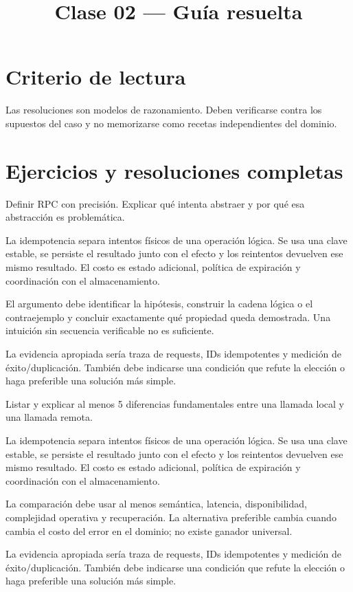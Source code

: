 \documentclass[variant=guia,cover=institutional,mode=screen]{ua-engineering-v6-article}
\title{Clase 02 --- Guía resuelta}
\author{\UAProfessor}
\date{\UADate}
\begin{document}
\section{Criterio de lectura}
Las resoluciones son modelos de razonamiento. Deben verificarse contra los supuestos del caso y no memorizarse como recetas independientes del dominio.

\section{Ejercicios y resoluciones completas}
\begin{uaexercise}
Definir RPC con precisión. Explicar qué intenta abstraer y por qué esa abstracción es problemática.
\end{uaexercise}
\begin{uaanswer}
La idempotencia separa intentos físicos de una operación lógica. Se usa una clave estable, se persiste el resultado junto con el efecto y los reintentos devuelven ese mismo resultado. El costo es estado adicional, política de expiración y coordinación con el almacenamiento.

El argumento debe identificar la hipótesis, construir la cadena lógica o el contraejemplo y concluir exactamente qué propiedad queda demostrada. Una intuición sin secuencia verificable no es suficiente.

La evidencia apropiada sería traza de requests, IDs idempotentes y medición de éxito/duplicación. También debe indicarse una condición que refute la elección o haga preferible una solución más simple.
\end{uaanswer}

\begin{uaexercise}
Listar y explicar al menos 5 diferencias fundamentales entre una llamada local y una llamada remota.
\end{uaexercise}
\begin{uaanswer}
La idempotencia separa intentos físicos de una operación lógica. Se usa una clave estable, se persiste el resultado junto con el efecto y los reintentos devuelven ese mismo resultado. El costo es estado adicional, política de expiración y coordinación con el almacenamiento.

La comparación debe usar al menos semántica, latencia, disponibilidad, complejidad operativa y recuperación. La alternativa preferible cambia cuando cambia el costo del error en el dominio; no existe ganador universal.

La evidencia apropiada sería traza de requests, IDs idempotentes y medición de éxito/duplicación. También debe indicarse una condición que refute la elección o haga preferible una solución más simple.
\end{uaanswer}
\end{document}
